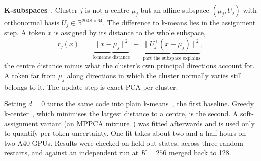 \documentclass[10pt,twocolumn]{article}
\begin{document}
\textbf{K-subspaces}~\cite{kplane,qflat}. Cluster $j$ is not a centre $\mu_j$ but an affine
subspace $(\mu_j, U_j)$ with orthonormal basis $U_j \in
\mathbb{R}^{2048\times 64}$. The difference to k-means lies in the assignment
step. A token $x$ is assigned by its distance to the whole subspace,
\begin{equation}
r_j(x) \;=\; \underbrace{\|x-\mu_j\|^2}_{\text{k-means distance}}
\;-\; \underbrace{\|U_j^\top (x-\mu_j)\|^2}_{\text{part the subspace explains}},
\label{eq:resid}
\end{equation}
the centre distance minus what the cluster's own principal directions account
for. A token far from $\mu_j$ along directions in which the cluster normally
varies still belongs to it. The update step is exact PCA per cluster.

\medskip
\noindent{}
\medskip

Setting $d=0$ turns the same code into plain k-means~\cite{lloyd}, the first
baseline. Greedy k-center~\cite{gonzalez}, which minimises the largest distance
to a centre, is the second. A soft-assignment variant (an MPPCA
mixture~\cite{mppca}) was fitted afterwards and is used only to quantify
per-token uncertainty. One fit takes about two and a half hours on two A40
GPUs. Results were checked on held-out states, across three random
restarts, and against an independent run at $K{=}256$ merged back to 128.
\end{document}
